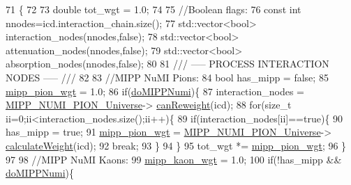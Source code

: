 \begin{DoxyCode}
71                                                                        \{
72 
73     \textcolor{keywordtype}{double} tot\_wgt = 1.0;
74     
75     \textcolor{comment}{//Boolean flags: }
76     \textcolor{keyword}{const} \textcolor{keywordtype}{int} nnodes=icd.interaction\_chain.size();
77     std::vector<bool> interaction\_nodes(nnodes,\textcolor{keyword}{false});
78     std::vector<bool> attenuation\_nodes(nnodes,\textcolor{keyword}{false});
79     std::vector<bool> absorption\_nodes(nnodes,\textcolor{keyword}{false});
80 \textcolor{comment}{}
81 \textcolor{comment}{    /// ----- PROCESS INTERACTION NODES ----- ///}
82 \textcolor{comment}{}    
83     \textcolor{comment}{//MIPP NuMI Pions:}
84     \textcolor{keywordtype}{bool} has\_mipp = \textcolor{keyword}{false};
85     \hyperlink{class_neutrino_flux_reweight_1_1_reweight_driver_a8e9c45612df3e46980dd60e9247311c4}{mipp\_pion\_wgt} = 1.0;
86     \textcolor{keywordflow}{if}(\hyperlink{class_neutrino_flux_reweight_1_1_reweight_driver_af4008e9db9a4dd5421e110e8281f5690}{doMIPPNumi})\{
87       interaction\_nodes = \hyperlink{class_neutrino_flux_reweight_1_1_reweight_driver_adc0be38614dfed8be560f60dda603d71}{MIPP\_NUMI\_PION\_Universe}->
      \hyperlink{class_neutrino_flux_reweight_1_1_m_i_p_p_numi_pion_yields_reweighter_a6a716b25ddb7d29ace9c7f07d84c91b2}{canReweight}(icd);
88       \textcolor{keywordflow}{for}(\textcolor{keywordtype}{size\_t} ii=0;ii<interaction\_nodes.size();ii++)\{
89         \textcolor{keywordflow}{if}(interaction\_nodes[ii]==\textcolor{keyword}{true})\{
90           has\_mipp = \textcolor{keyword}{true};
91           \hyperlink{class_neutrino_flux_reweight_1_1_reweight_driver_a8e9c45612df3e46980dd60e9247311c4}{mipp\_pion\_wgt} = \hyperlink{class_neutrino_flux_reweight_1_1_reweight_driver_adc0be38614dfed8be560f60dda603d71}{MIPP\_NUMI\_PION\_Universe}->
      \hyperlink{class_neutrino_flux_reweight_1_1_m_i_p_p_numi_pion_yields_reweighter_a84ef113a8ef34c2f9f5813938ec35382}{calculateWeight}(icd);
92           \textcolor{keywordflow}{break}; 
93         \}
94       \}
95       tot\_wgt *= \hyperlink{class_neutrino_flux_reweight_1_1_reweight_driver_a8e9c45612df3e46980dd60e9247311c4}{mipp\_pion\_wgt};
96     \}
97     
98     \textcolor{comment}{//MIPP NuMI Kaons:}
99     \hyperlink{class_neutrino_flux_reweight_1_1_reweight_driver_a908938bcd5304de35956da51a806ef62}{mipp\_kaon\_wgt} = 1.0;
100     \textcolor{keywordflow}{if}(!has\_mipp && \hyperlink{class_neutrino_flux_reweight_1_1_reweight_driver_af4008e9db9a4dd5421e110e8281f5690}{doMIPPNumi})\{

\end{DoxyCode}
